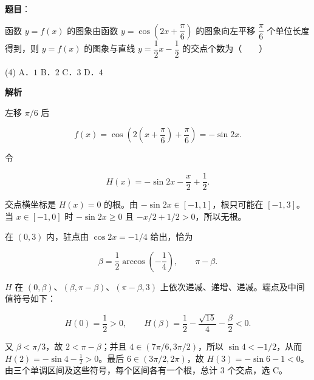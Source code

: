 \begin{answer}

\textbf{题目}：

函数 $y=f(x)$ 的图象由函数 $y=\cos\left(2x+\dfrac\pi6\right)$ 的图象向左平移 $\dfrac\pi6$ 个单位长度得到，则 $y=f(x)$ 的图象与直线 $y=\dfrac12x-\dfrac12$ 的交点个数为\mbox{（　　）}

\begin{gkopts}(4)
\task A．$1$
\task B．$2$
\task C．$3$
\task D．$4$
\end{gkopts}

\textbf{解析}

左移 $\pi/6$ 后

\nopagebreak[4]
\[
f(x)=\cos\left(2\left(x+\frac\pi6\right)+\frac\pi6\right)=-\sin2x.
\]

令

\nopagebreak[4]
\[
H(x)=-\sin2x-\frac x2+\frac12.
\]

交点横坐标是 $H(x)=0$ 的根。由 $-\sin2x\in[-1,1]$，根只可能在 $[-1,3]$。当 $x\in[-1,0]$ 时 $-\sin2x\geqslant0$ 且 $-x/2+1/2>0$，所以无根。

在 $(0,3)$ 内，驻点由 $\cos2x=-1/4$ 给出，恰为

\nopagebreak[4]
\[
\beta=\frac12\arccos\left(-\frac14\right),\qquad \pi-\beta.
\]

$H$ 在 $(0,\beta)$、$(\beta,\pi-\beta)$、$(\pi-\beta,3)$ 上依次递减、递增、递减。端点及中间值符号如下：

\nopagebreak[4]
\[
H(0)=\frac12>0,\qquad
H(\beta)=\frac12-\frac{\sqrt{15}}4-\frac\beta2<0.
\]


又 $\beta<\pi/3$，故 $2<\pi-\beta$；并且 $4\in(7\pi/6,3\pi/2)$，所以 $\sin4<-1/2$，从而 $H(2)=-\sin4-\frac12>0$。最后 $6\in(3\pi/2,2\pi)$，故 $H(3)=-\sin6-1<0$。由三个单调区间及这些符号，每个区间各有一个根，总计 $3$ 个交点，选 C。


\end{answer}
